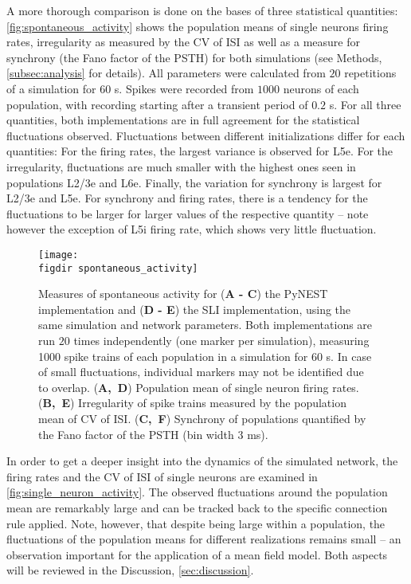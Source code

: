 A more thorough comparison is done on the bases of three statistical quantities: 
\autoref{fig:spontaneous_activity} shows the population means of single neurons firing rates, 
irregularity as measured by the CV of ISI as well as a measure for synchrony (the Fano factor of the 
PSTH) for both simulations (see Methods, \autoref{subsec:analysis} for details). 
All parameters were calculated from $20$ repetitions of a simulation for 
$60$ s.
Spikes were recorded from $1000$ neurons of each population, with recording 
starting after a transient period of $0.2$ s. 
For all three quantities, both implementations are in full agreement for the statistical fluctuations
observed. Fluctuations between different initializations differ for each quantities: For the firing rates, 
the largest variance is observed for L5e. For the irregularity, fluctuations are much smaller with the 
highest ones seen in populations L2/3e and L6e. Finally, the variation for synchrony is largest for 
L2/3e and L5e. For synchrony and firing rates, there is a tendency for the fluctuations to be larger for larger
values of the respective quantity -- note however the exception of L5i firing rate, which shows very little
fluctuation.
\begin{figure}[tb]
    \centering
    \texttt{[image: \\figdir spontaneous\_activity]}
    \caption[Spontaneous activity: PyNEST and SLI]{
        Measures of spontaneous activity for
        (\textbf{A - C}) the PyNEST implementation and (\textbf{D - E}) the SLI implementation, 
        using the same simulation and network parameters.
        Both implementations are run $20$ times independently (one marker per simulation),
        measuring 1000 spike trains of each population in a simulation for 60 s.
        In case of small 
        fluctuations, individual markers may not be identified due to overlap. 
        \quad (\textbf{A,~D}) Population mean of single neuron firing rates.
        \quad (\textbf{B,~E}) Irregularity of spike trains measured by the 
        population mean of CV of ISI.
        \quad (\textbf{C,~F}) Synchrony of populations quantified 
        by the Fano factor of the PSTH (bin width 3 ms).
    }
    \label{fig:spontaneous_activity}
\end{figure}

In order to get a deeper insight into the dynamics of the simulated network, the firing 
rates and the CV of ISI of single neurons are examined in \autoref{fig:single_neuron_activity}.
The observed fluctuations around the population mean are remarkably large and can 
be tracked back to the specific connection rule applied.
Note, however, that despite being large within a population, the 
fluctuations of the population means for different realizations remains small -- an observation 
important for the application of a mean field model. Both aspects will be reviewed in the 
Discussion, \autoref{sec:discussion}. 

